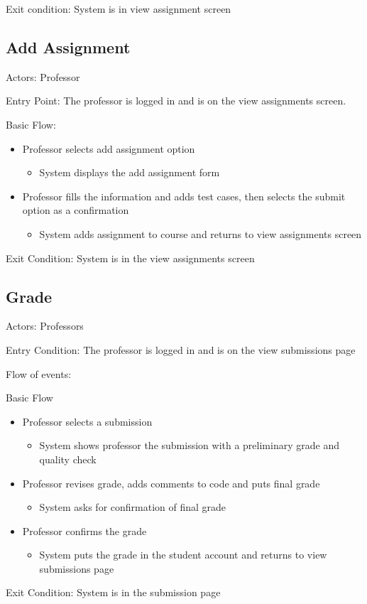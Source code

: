 Exit condition: System is in view assignment screen

\subsection*{Add Assignment}\label{section:h.y1nuewn5cyxy}
Actors: Professor

Entry Point: The professor is logged in and is on the view 
assignments screen.

Basic Flow:

\begin{itemize}
\item Professor selects add assignment option
\begin{itemize}
\item System displays the add assignment form
\end{itemize}
\item Professor fills the information and adds test cases, then selects 
the submit option as a confirmation
\begin{itemize}
\item System adds assignment to course and returns to view assignments 
screen
\end{itemize}
\end{itemize}
Exit Condition: System is in the view assignments screen

\subsection*{Grade}\label{section:h.b0103s5vycbq}
Actors: Professors

Entry Condition: The professor is logged in and is on the view 
submissions page

Flow of events:

Basic Flow

\begin{itemize}
\item Professor selects a submission
\begin{itemize}
\item System shows professor the submission with a preliminary grade and 
quality check
\end{itemize}
\item Professor revises grade, adds comments to code and puts final 
grade
\begin{itemize}
\item System asks for confirmation of final grade
\end{itemize}
\item Professor confirms the grade
\begin{itemize}
\item System puts the grade in the student account and returns to view 
submissions page
\end{itemize}
\end{itemize}
Exit Condition: System is in the submission page

